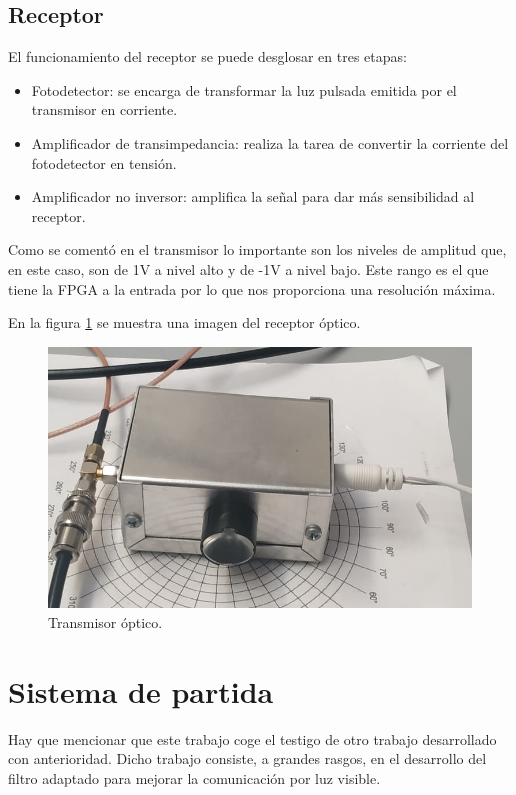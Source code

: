 \subsection{Receptor}
El funcionamiento del receptor se puede desglosar en tres etapas:
\begin{itemize}
    \item Fotodetector: se encarga de transformar la luz pulsada emitida por el transmisor
    en corriente.
    \item Amplificador de transimpedancia: realiza la tarea de convertir la corriente del 
    fotodetector en tensión.
    \item Amplificador no inversor: amplifica la señal para dar más sensibilidad al 
    receptor.
\end{itemize}

Como se comentó en el transmisor lo importante son los niveles de amplitud que, en este 
caso, son de 1V a nivel alto y de -1V a nivel bajo. Este rango es el que tiene la 
FPGA a la entrada por lo que nos proporciona una resolución máxima.

En la figura \ref{recept} se muestra una imagen del receptor óptico.

\begin{figure}[ht]
    \centering
    \includegraphics[scale=0.40]{./figuras/recept.png}
    \caption{\small{Transmisor óptico.}}
    \label{recept}%
\end{figure}

\section{Sistema de partida}
Hay que mencionar que este trabajo coge el testigo de otro trabajo desarrollado con
anterioridad. Dicho trabajo consiste, a grandes rasgos, en el desarrollo del filtro 
adaptado para mejorar la comunicación por luz visible. 

